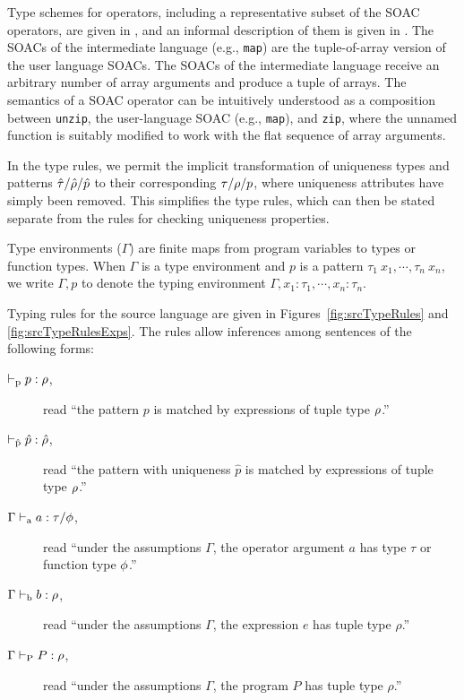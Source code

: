 Type schemes for operators, including a representative subset of the
SOAC operators, are given in , and an
informal description of them is given in .
The SOACs of the intermediate language (e.g., \lstinline{map}) are the
tuple-of-array version of the user language SOACs. The SOACs of the
intermediate language receive an arbitrary number of array arguments
and produce a tuple of arrays. The semantics of a SOAC operator can be
intuitively understood as a composition between \lstinline{unzip}, the
user-language SOAC (e.g., \lstinline{map}), and \lstinline{zip}, where the
unnamed function is suitably modified to work with the flat sequence
of array arguments.

In the type rules, we permit the implicit transformation of uniqueness
types and patterns $\hat{\tau}/\hat{\rho}/\hat{p}$ to their corresponding
$\tau/\rho/p$, where uniqueness attributes have simply been removed.
This simplifies the type rules, which can then be stated separate from
the rules for checking uniqueness properties.

Type environments ($\Gamma$) are finite
maps from program variables to types or function types. When $\Gamma$
is a type environment and $p$ is a pattern
$\tau_1~x_1,\cdots,\tau_n~x_n$, we write $\Gamma,p$ to denote the
typing environment $\Gamma,x_1:\tau_1,\cdots,x_n:\tau_n$.

Typing rules for the source language are given in
Figures~\ref{fig:srcTypeRules} and \ref{fig:srcTypeRulesExps}. The
rules allow inferences among sentences of the following forms:

\begin{description}
\item[$\vdash_\textrm{p} p : \rho$,] read ``the pattern $p$ is matched by
  expressions of tuple type $\rho$.''
\item[$\vdash_{\hat{\textrm{p}}} \hat{p} : \hat{\rho}$,] read ``the pattern with uniqueness
  $\hat{p}$ is matched by expressions of tuple type $\rho$.''
\item[$\Gamma \vdash_\textrm{a} a : \tau / \phi$,] read ``under the assumptions
$\Gamma$, the operator argument $a$ has type $\tau$ or function type
$\phi$.''
\item[$\Gamma \vdash_\textrm{b} b : \rho$,] read ``under the assumptions $\Gamma$,
  the expression $e$ has tuple type $\rho$.''
\item[$\Gamma \vdash_\textrm{P} P : \rho$,] read ``under the assumptions
$\Gamma$, the program $P$ has tuple type $\rho$.''
\end{description}

